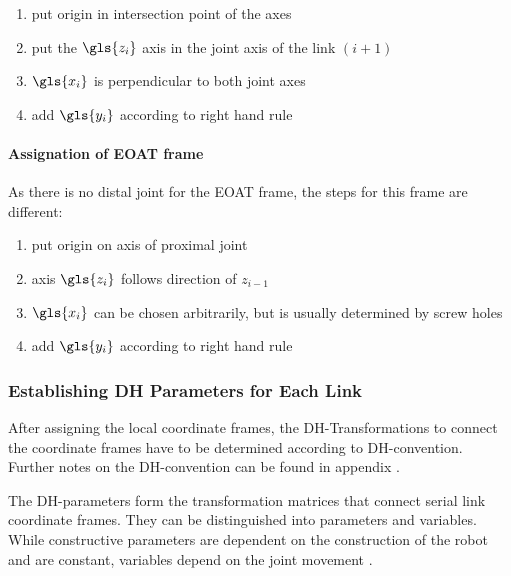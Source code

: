 \begin{itemize}[wide=\parindent]
	\begin{enumerate}[label=\emph{\alph*)}]
		\item put origin in intersection point of the axes
		\item put the $\gls{z_i}$ axis in the joint axis of the link $(i+1)$
		\item $\gls{x_i}$ is perpendicular to both joint axes
		\item add $\gls{y_i}$ according to right hand rule
	\end{enumerate}
\end{itemize}





\paragraph{Assignation of \ac{EOAT} frame}
As there is no distal joint for the \ac{EOAT} frame, the steps for this frame are different:

\begin{enumerate}[label=\emph{\alph*)}]
	\item put origin on axis of proximal joint 
	\item axis $\gls{z_i}$ follows direction of $z_{i-1}$
	\item $\gls{x_i}$ can be chosen arbitrarily, but is usually determined by screw holes
	\item add $\gls{y_i}$ according to right hand rule
\end{enumerate}


\subsubsection{Establishing \ac{DH} Parameters for Each Link} \label{sec:DHparPerLink}

After assigning the local coordinate frames, the \ac{DH}-Transformations to connect the coordinate frames have to be determined according to \ac{DH}-convention.
Further notes on the \ac{DH}-convention can be found in appendix .




The \ac{DH}-parameters form the transformation matrices that connect serial link coordinate frames. They can be distinguished into parameters and variables. While constructive parameters are dependent on the construction of the robot and are constant, variables depend on the joint movement \cite{FwdInvAnalysRobManip} \cite{ConstantinForwardKA} \cite{DenavitHartenbergKonventionen}.

